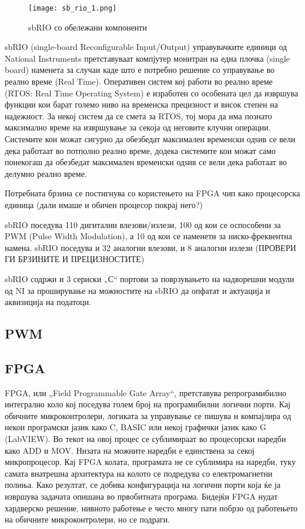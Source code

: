 \documentclass{article}
\begin{document}
\begin{figure}[h]
\centering
\texttt{[image: sb\_rio\_1.png]}
\caption{sbRIO со обележани компоненти}
\label{fig:sb_rio_1.png}

\end{figure}
sbRIO (single-board Reconfigurable Input/Output) управувачките единици од National Instruments претставуваат компјутер монитран на една плочка (single board) наменета за случаи каде што е потребно решение со управување во реално време (Real Time). Оперативен систем кој работи во реално време (RTOS: Real Time Operating System) е изработен со особената цел да извршува функции кои барат големо ниво на временска прецизност и висок степен на надежност. За некој систем да се смета за RTOS, тој мора да има познато максимално време на извршување за секоја од неговите клучни операции. Системите кои можат сигурно да обезбедат максимален временски одѕив се вели дека работаат во потполно реално време, додека системите кои можат само понекогаш да обезбедат максимален временски одѕив се вели дека работаат во делумно реално време.  
 
Потребната брзина се постигнува со користењето на FPGA чип како процесорска единица (дали имаше и обичен процесор покрај него?)

sbRIO поседува 110 дигитални влезови/излези, 100 од кои се оспособени за PWM (Pulse Width Modulation), а 10 од кои се наменети за ниско-фреквентна намена. sbRIO поседува и 32 аналогни влезови, и 8 аналогни излези (ПРОВЕРИ ГИ БРЗИНИТЕ И ПРЕЦИЗНОСТИТЕ)

sbRIO содржи и 3 сериски „С“ портови за поврзувањето на надворешни модули од NI за проширување на можностите на sbRIO да опфатат и актуација и аквизиција на податоци.
\subsection{PWM}

\subsection{FPGA}
FPGA, или „Field Programmable Gate Array“, претставува репрограмибилно интегрално коло кој поседува голем број на програмибилни логични порти. Кај обичните микроконтролери, логиката за управување се пишува и компајлира од некои програмски јазик како C, BASIC или некој графички јазик како G (LabVIEW). Во текот на овој процес се сублимираат во процесорски наредби како ADD и MOV. Низата на можните наредби е единствена за секој микропроцесор. Кај FPGA колата, програмата не се сублимира на наредби, туку самата внатрешна архитектура на колото се подредува со електромагнетни полиња. Како резултат, се добива конфигурација на логични порти која ќе ја извршува задачата опишана во првобитната програма. Бидејќи FPGA нудат хардверско решение, нивното работење е често многу пати побрзо од работењето на обичните микроконтролери, но се подраги.  
\end{document}

